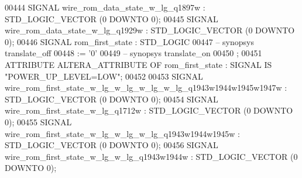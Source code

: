 \begin{DoxyCode}
{00444      \textcolor{keywordflow}{SIGNAL}  \textcolor{vhdlchar}{wire_rom_data_state_w_lg_q1897w}    \textcolor{vhdlchar}{:}   \textcolor{comment}{STD\_LOGIC\_VECTOR} \textcolor{vhdlchar}{(}\textcolor{vhdllogic}{}\textcolor{vhdllogic}{0} \textcolor{keywordflow}{DOWNTO} \textcolor{vhdllogic}{}\textcolor{vhdllogic}{0}\textcolor{vhdlchar}{)};
00445      \textcolor{keywordflow}{SIGNAL}  \textcolor{vhdlchar}{wire_rom_data_state_w_lg_q1929w}    \textcolor{vhdlchar}{:}   \textcolor{comment}{STD\_LOGIC\_VECTOR} \textcolor{vhdlchar}{(}\textcolor{vhdllogic}{}\textcolor{vhdllogic}{0} \textcolor{keywordflow}{DOWNTO} \textcolor{vhdllogic}{}\textcolor{vhdllogic}{0}\textcolor{vhdlchar}{)};
00446      \textcolor{keywordflow}{SIGNAL}  \textcolor{vhdlchar}{rom_first_state}    \textcolor{vhdlchar}{:}   \textcolor{comment}{STD\_LOGIC}
00447 \textcolor{keyword}{     -- synopsys translate\_off}
00448       \textcolor{vhdlchar}{:=} \textcolor{vhdlchar}{'}\textcolor{vhdllogic}{}\textcolor{vhdllogic}{0}\textcolor{vhdlchar}{'}
00449 \textcolor{keyword}{     -- synopsys translate\_on}
00450      ;
00451      \textcolor{keywordflow}{ATTRIBUTE} \textcolor{vhdlchar}{ALTERA_ATTRIBUTE} \textcolor{keywordflow}{OF} \textcolor{vhdlchar}{rom_first_state} \textcolor{vhdlchar}{:} \textcolor{keywordflow}{SIGNAL} \textcolor{keywordflow}{IS} \textcolor{keyword}{"POWER\_UP\_LEVEL=LOW"};
00452 
00453      \textcolor{keywordflow}{SIGNAL}  \textcolor{vhdlchar}{wire_rom_first_state_w_lg_w_lg_w_lg_w_lg_q1943w1944w1945w1947w} \textcolor{vhdlchar}{:}   \textcolor{comment}{STD\_LOGIC\_VECTOR} \textcolor{vhdlchar}{(}\textcolor{vhdllogic}{}\textcolor{vhdllogic}{0} \textcolor{keywordflow}{DOWNTO} \textcolor{vhdllogic}{}\textcolor{vhdllogic}{
      0}\textcolor{vhdlchar}{)};
00454      \textcolor{keywordflow}{SIGNAL}  \textcolor{vhdlchar}{wire_rom_first_state_w_lg_q1712w}   \textcolor{vhdlchar}{:}   \textcolor{comment}{STD\_LOGIC\_VECTOR} \textcolor{vhdlchar}{(}\textcolor{vhdllogic}{}\textcolor{vhdllogic}{0} \textcolor{keywordflow}{DOWNTO} \textcolor{vhdllogic}{}\textcolor{vhdllogic}{0}\textcolor{vhdlchar}{)};
00455      \textcolor{keywordflow}{SIGNAL}  \textcolor{vhdlchar}{wire_rom_first_state_w_lg_w_lg_w_lg_q1943w1944w1945w}   \textcolor{vhdlchar}{:}   \textcolor{comment}{STD\_LOGIC\_VECTOR} \textcolor{vhdlchar}{(}\textcolor{vhdllogic}{}\textcolor{vhdllogic}{0} \textcolor{keywordflow}{DOWNTO} \textcolor{vhdllogic}{}\textcolor{vhdllogic}{0}\textcolor{vhdlchar}{)};
00456      \textcolor{keywordflow}{SIGNAL}  \textcolor{vhdlchar}{wire_rom_first_state_w_lg_w_lg_q1943w1944w} \textcolor{vhdlchar}{:}   \textcolor{comment}{STD\_LOGIC\_VECTOR} \textcolor{vhdlchar}{(}\textcolor{vhdllogic}{}\textcolor{vhdllogic}{0} \textcolor{keywordflow}{DOWNTO} \textcolor{vhdllogic}{}\textcolor{vhdllogic}{0}\textcolor{vhdlchar}{)};
}
\end{DoxyCode}

